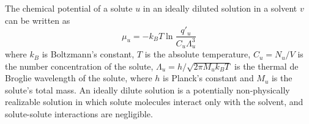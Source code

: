 \documentclass[9pt,bestpractices]{livecoms}
\begin{document}
The chemical potential of a solute $u$ in an ideally diluted solution in a solvent $v$ can be written as~\cite{guggenheim1952mixtures504,gilson1997statisticalthermodynamic,gilson2007calculation}
\begin{equation}
  \mu_u = -k_B T \ln \frac{q'_u}{C_u \Lambda_u^3}
  \label{eq:chemical-potential-definition}
\end{equation}
where $k_B$ is Boltzmann's constant, $T$ is the absolute temperature, $C_u = N_u/V$ is the number concentration of the solute, $\Lambda_u = h/\sqrt{2 \pi M_u k_B T}$ is the thermal de Broglie wavelength of the solute, where $h$ is Planck's constant and $M_u$ is the solute's total mass. 
An ideally dilute solution is a potentially non-physically realizable solution in which solute molecules interact only with the solvent, and solute-solute interactions are negligible.~\cite{levine2009physicalchemistrybook6ed}
\end{document}
